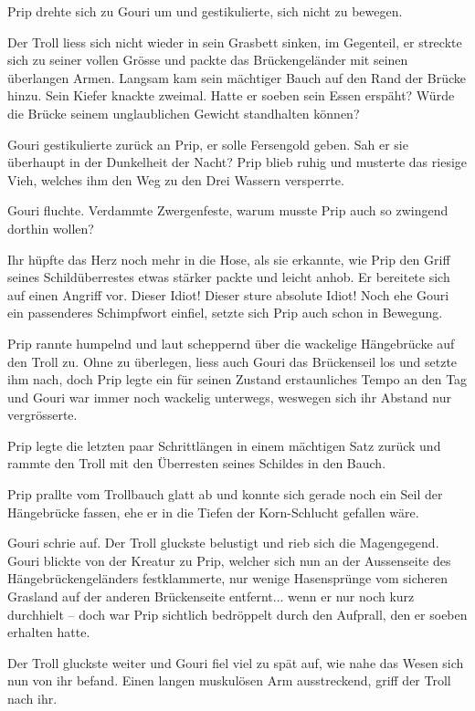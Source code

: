 Prip drehte sich zu Gouri um und gestikulierte, sich nicht zu bewegen.

Der Troll liess sich nicht wieder in sein Grasbett sinken, im Gegenteil, er streckte sich zu seiner vollen Grösse und packte das Brückengeländer mit seinen überlangen Armen. Langsam kam sein mächtiger Bauch auf den Rand der Brücke hinzu. Sein Kiefer knackte zweimal. Hatte er soeben sein Essen erspäht? Würde die Brücke seinem unglaublichen Gewicht standhalten können?

Gouri gestikulierte zurück an Prip, er solle Fersengold geben. Sah er sie überhaupt in der Dunkelheit der Nacht? Prip blieb ruhig und musterte das riesige Vieh, welches ihm den Weg zu den Drei Wassern versperrte.

Gouri fluchte. Verdammte Zwergenfeste, warum musste Prip auch so zwingend dorthin wollen?

Ihr hüpfte das Herz noch mehr in die Hose, als sie erkannte, wie Prip den Griff seines Schildüberrestes etwas stärker packte und leicht anhob. Er bereitete sich auf einen Angriff vor. Dieser Idiot! Dieser sture absolute Idiot! Noch ehe Gouri ein passenderes Schimpfwort einfiel, setzte sich Prip auch schon in Bewegung.

Prip rannte humpelnd und laut scheppernd über die wackelige Hängebrücke auf den Troll zu. Ohne zu überlegen, liess auch Gouri das Brückenseil los und setzte ihm nach, doch Prip legte ein für seinen Zustand erstaunliches Tempo an den Tag und Gouri war immer noch wackelig unterwegs, weswegen sich ihr Abstand nur vergrösserte.

Prip legte die letzten paar Schrittlängen in einem mächtigen Satz zurück und rammte den Troll mit den Überresten seines Schildes in den Bauch.

Prip prallte vom Trollbauch glatt ab und konnte sich gerade noch ein Seil der Hängebrücke fassen, ehe er in die Tiefen der Korn-Schlucht gefallen wäre.

Gouri schrie auf. Der Troll gluckste belustigt und rieb sich die Magengegend. Gouri blickte von der Kreatur zu Prip, welcher sich nun an der Aussenseite des Hängebrückengeländers festklammerte, nur wenige Hasensprünge vom sicheren Grasland auf der anderen Brückenseite entfernt... wenn er nur noch kurz durchhielt – doch war Prip sichtlich bedröppelt durch den Aufprall, den er soeben erhalten hatte.

Der Troll gluckste weiter und Gouri fiel viel zu spät auf, wie nahe das Wesen sich nun von ihr befand. Einen langen muskulösen Arm ausstreckend, griff der Troll nach ihr.

